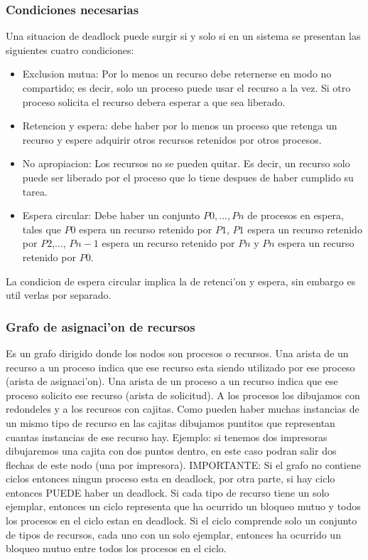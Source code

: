 \documentclass[a4paper,10pt]{article}
\begin{document}
\subsubsection{Condiciones necesarias}
Una situacion de deadlock puede surgir si y solo si en un sistema se presentan las siguientes cuatro condiciones:
\begin{itemize}
 \item Exclusion mutua: Por lo menos un recurso debe reternerse en modo no compartido; es decir, solo un proceso puede usar el recurso a la vez. Si otro proceso solicita el recurso debera esperar a que sea liberado.
 \item Retencion y espera: debe haber por lo menos un proceso que retenga un recurso y espere adquirir otros recursos retenidos por otros procesos.
 \item No apropiacion: Los recursos no se pueden quitar. Es decir, un recurso solo puede ser liberado por el proceso que lo tiene despues de haber cumplido su tarea.
 \item Espera circular: Debe haber un conjunto ${P0,...,Pn}$ de procesos en espera, tales que $P0$ espera un recurso retenido por $P1$, $P1$ espera un recurso retenido por $P2$,..., $Pn-1$ espera un recurso retenido por $Pn$ y $Pn$ espera un recurso retenido por $P0$.
\end{itemize}
La condicion de espera circular implica la de retenci'on y espera, sin embargo es util verlas por separado.

\subsubsection{Grafo de asignaci'on de recursos}
Es un grafo dirigido donde los nodos son procesos o recursos. Una arista de un recurso a un proceso indica que ese recurso esta siendo utilizado por ese proceso (arista de asignaci'on). Una arista de un proceso a un recurso indica que ese proceso solicito ese recurso (arista de solicitud).
A los procesos los dibujamos con redondeles y a los recursos con cajitas. Como pueden haber muchas instancias de un mismo tipo de recurso en las cajitas dibujamos puntitos que representan cuantas instancias de ese recurso hay. Ejemplo: si tenemos dos impresoras dibujaremos una cajita con dos puntos dentro, en este caso podran salir dos flechas de este nodo (una por impresora). 
IMPORTANTE: Si el grafo no contiene ciclos entonces ningun proceso esta en deadlock, por otra parte, si hay ciclo entonces PUEDE haber un deadlock.
Si cada tipo de recurso tiene un solo ejemplar, entonces un ciclo representa que ha ocurrido un bloqueo mutuo y todos los procesos en el ciclo estan en deadlock.
Si el ciclo comprende solo un conjunto de tipos de recursos, cada uno con un solo ejemplar, entonces ha ocurrido un bloqueo mutuo entre todos los procesos en el ciclo.
\end{document}
